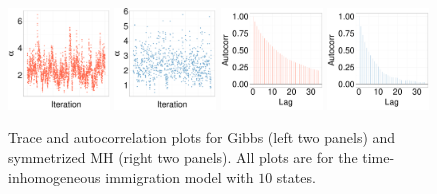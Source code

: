   \begin{figure}[H]
  \centering
  \begin{minipage}[!hp]{0.99\linewidth}
    \includegraphics [width=0.24\textwidth, angle=0]{figs/QC_ks/qc_traceGBS_4_03_10_.pdf}
    \includegraphics [width=0.24\textwidth, angle=0]{figs/QC_ks/qc_traceMH_4_03_10_.pdf}
    \includegraphics [width=0.24\textwidth, angle=0]{figs/QC_ks/qc_gbsacf_4_03_10_.pdf}
    \includegraphics [width=0.24\textwidth, angle=0]{figs/QC_ks/qc_mhacf_4_03_10_.pdf}
  \end{minipage}

\caption{Trace and autocorrelation plots for Gibbs (left two panels) and symmetrized MH (right two panels). All plots are for the time-inhomogeneous immigration model with $10$ states.}
 
     \label{fig:TRACE_CQ}
  \end{figure}


